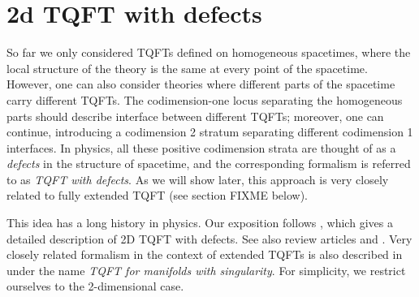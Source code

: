 \chapter{2d TQFT with defects}\label{c:2d-defects}


So far we only considered TQFTs defined on homogeneous spacetimes, where the
local structure of the theory is the same at every point of the spacetime.
However, one can also consider theories where different parts of the spacetime
carry different TQFTs. The codimension-one locus separating the homogeneous
parts should describe interface between different TQFTs; moreover, one can
continue, introducing a codimension 2 stratum separating different codimension
1 interfaces. In physics, all these positive codimension strata are thought of
as a \emph{defects} in the structure of spacetime, and the
corresponding formalism is referred to as \emph{TQFT with
defects}. As we will show later, this approach
is very closely related to fully extended TQFT (see section FIXME below).

This idea has a long history in physics. Our exposition follows  \cite{dkr},
which gives a detailed description of 2D TQFT with defects. See also review
articles \cite{carqueville} and \cite{cdr}. Very closely related formalism in
the context of extended TQFTs is also described in \cite[Section 4.3]{lurie}
under the name \emph{TQFT for manifolds with singularity}. For simplicity, we
restrict ourselves to the 2-dimensional case.

